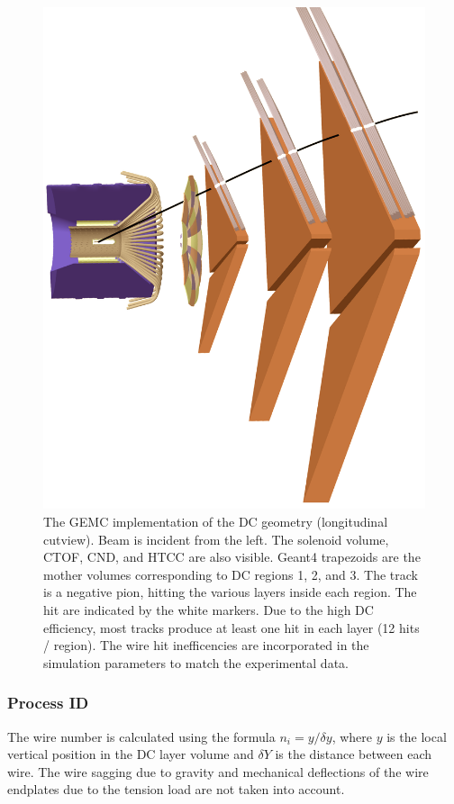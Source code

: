 \begin{figure}[h]
	\centering
	\includegraphics[width=0.99\columnwidth,keepaspectratio]{img/dcGeometry.png}
	\caption{The GEMC implementation of the DC geometry (longitudinal cutview).
	         Beam is incident from the left. The solenoid volume, CTOF, CND, and HTCC are also visible.
             Geant4 trapezoids are the mother volumes corresponding to DC regions 1, 2, and 3. The track is a negative pion,
			 hitting the various layers inside each region. The hit are indicated by the white markers. Due to the high DC
             efficiency, most tracks produce at least one hit in each layer (12 hits / region).
             The wire hit inefficencies are incorporated in the simulation parameters to match the experimental data.}
	\label{fig:dcGeometry}
\end{figure}


\subsubsection{Process ID}
The wire number is calculated using the formula $n_i = y / \delta y$, where $y$ is the local vertical position in the DC layer volume
and $\delta Y$ is the distance between each wire.
The wire sagging due to gravity and mechanical deflections of the wire endplates due to the tension load are not taken into account.

